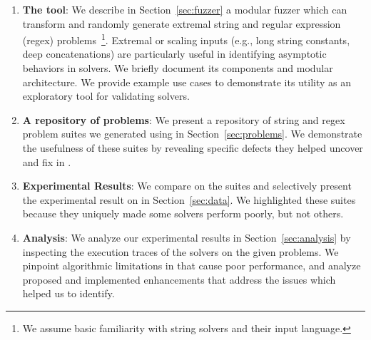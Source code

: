\begin{enumerate}
\item \textbf{The \fuzzer{} tool}: We describe in
  Section~\ref{sec:fuzzer} a modular fuzzer which can transform and
  randomly generate extremal \smtfull{} string and regular expression
  (regex) problems~\footnote{We assume basic
    familiarity with string solvers and their input
    language.}. Extremal or scaling inputs (e.g., long string
  constants, deep concatenations) are particularly useful in
  identifying asymptotic behaviors in solvers. We briefly document its
  components and modular architecture. We provide example use cases to
  demonstrate its utility as an exploratory tool for validating
  solvers.
  
\item \textbf{A repository of \smtfull{} problems}: We present a
  repository of \smtfull{} string and regex problem suites we
  generated using \fuzzer{} in Section~\ref{sec:problems}. We
  demonstrate the usefulness of these suites by revealing specific
  defects they helped uncover and fix in \us{}.

\item \textbf{Experimental Results}: We compare \theSolvers{} on the
  \fuzzer{} suites and selectively present the experimental result on
  \theSuites{} in Section~\ref{sec:data}. We highlighted these suites
  because they uniquely made some solvers perform poorly, but not
  others.

\item \textbf{Analysis}: We analyze our experimental results in
  Section~\ref{sec:analysis} by inspecting the execution traces of the
  solvers on the given problems. We pinpoint algorithmic limitations
  in \us{} that cause poor performance, and analyze proposed and
  implemented enhancements that address the issues which \fuzzer{}
  helped us to identify.
\end{enumerate}
